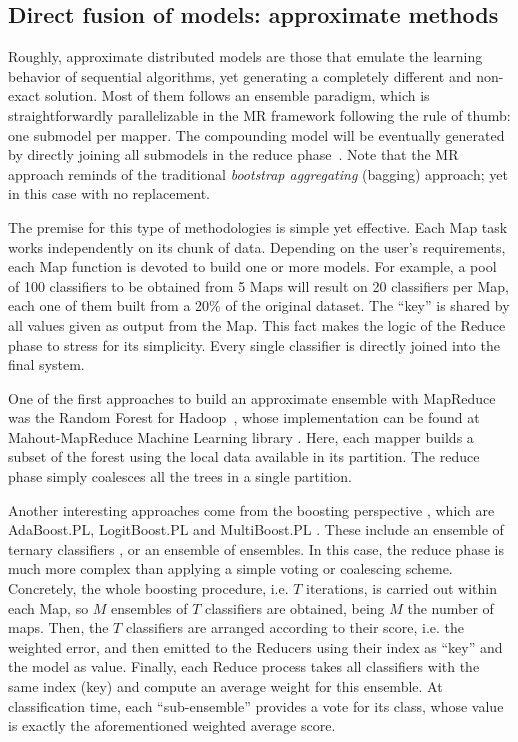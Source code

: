 \documentclass[3p,review]{elsarticle}
\begin{document}
\subsection{Direct fusion of models: approximate methods}\label{subsec:approx}

Roughly, approximate distributed models are those that emulate the learning behavior of sequential algorithms, yet generating a completely different and non-exact solution. Most of them follows an ensemble paradigm, which is straightforwardly parallelizable in the MR framework following the rule of thumb: one submodel per mapper. The compounding model will be eventually generated by directly joining all submodels in the reduce phase~\cite{Polikar2006}. Note that the MR approach reminds of the traditional \textit{bootstrap aggregating} (bagging) approach; yet in this case with no replacement. 

The premise for this type of methodologies is simple yet effective. Each Map task works independently on its chunk of data. Depending on the user's requirements, each Map function is devoted to build one or more models. For example, a pool of 100 classifiers to be obtained from 5 Maps will result on 20 classifiers per Map, each one of them built from a 20\% of the original dataset. The ``key'' is shared by all values given as output from the Map. This fact makes the logic of the Reduce phase to stress for its simplicity. Every single classifier is directly joined into the final system. 

One of the first approaches to build an approximate ensemble with MapReduce was the Random Forest for Hadoop~\cite{Assun13-RF-H,Wang13-RF-H}, whose implementation can be found at Mahout-MapReduce Machine Learning library \cite{Owe11, Mahout17}. Here, each mapper builds a subset of the forest using the local data available in its partition. The reduce phase simply coalesces all the trees in a single partition.

Another interesting approaches come from the boosting perspective \cite{schapire99brief}, which are AdaBoost.PL, LogitBoost.PL and MultiBoost.PL \cite{Palit12-Boost}. These include an ensemble of ternary classifiers \cite{schapire99confidence}, or an ensemble of ensembles. In this case, the reduce phase is much more complex than applying a simple voting or coalescing scheme. Concretely, the whole boosting procedure, i.e. $T$ iterations, is carried out within each Map, so $M$ ensembles of $T$ classifiers are obtained, being $M$ the number of maps. Then, the $T$ classifiers are arranged according to their score, i.e. the weighted error, and then emitted to the Reducers using their index as ``key'' and the model as value. Finally, each Reduce process takes all classifiers with the same index (key) and compute an average weight for this ensemble. At classification time, each ``sub-ensemble'' provides a vote for its class, whose value is exactly the aforementioned weighted average score.  
\end{document}
